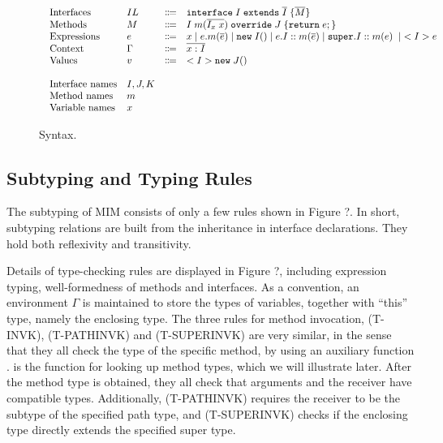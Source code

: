 \begin{figure}[t]
\begin{displaymath}
\begin{array}{l}
\begin{array}{llrl}
\text{Interfaces}   & IL & \Coloneqq & \texttt{interface} \; I \; \texttt{extends} \; \overline{I} \; {\{} \overline{M} {\}} \\
\text{Methods}      & M  & \Coloneqq & I \; m (\overline{I_x \; x}) \; \texttt{override} \; J \; {\{} \texttt{return} \; e ; {\}} \\
\text{Expressions}  & e  & \Coloneqq & x \mid
e.m(\overline{e}) \mid
\texttt{new} \; I() \mid
e.I::m(\overline{e}) \mid
\texttt{super}.I::m(e) \; \mid \; <I> e \\
\text{Context}      & \Gamma & \Coloneqq & \overline{x:I} \\
\text{Values}       & v & \Coloneqq & <I>\texttt{new} \; J() \\
\\
\text{Interface names} & I, J, K & & \\
\text{Method names} & m & & \\
\text{Variable names} & x & &
\end{array}
\end{array}
\end{displaymath}
\caption{Syntax. }\label{fig:syntax}
\end{figure}

\subsection{Subtyping and Typing Rules}
The subtyping of MIM consists of only a few rules shown in Figure ?.
In short, subtyping relations are built from the inheritance in interface
declarations. They hold both reflexivity and transitivity.

Details of type-checking rules are displayed in Figure ?, including expression
typing, well-formedness of methods and interfaces. As a convention, an environment
$\Gamma$ is maintained to store the types of variables, together with ``this'' type, namely
the enclosing type. The three rules for method invocation, (T-INVK), (T-PATHINVK) and (T-SUPERINVK)
are very similar, in the sense that they all check the type of the specific method, by using
an auxiliary function \mtype. \mtype is the function for looking up method types, which we will
illustrate later. After the method type is obtained, they all check that arguments and the receiver
have compatible types. Additionally, (T-PATHINVK) requires the receiver to be the subtype of the specified
path type, and (T-SUPERINVK) checks if the enclosing type directly extends the specified super type.

